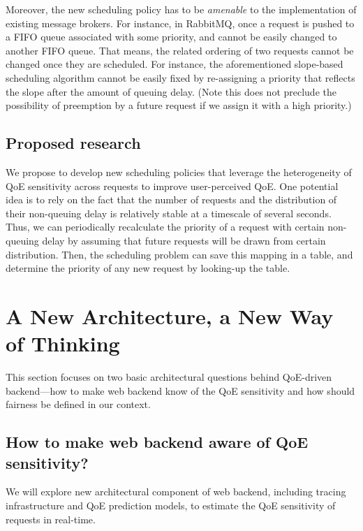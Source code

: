 Moreover, the new scheduling policy has to be {\em amenable} to the implementation of existing message brokers. 
For instance, in RabbitMQ, once a request is pushed to a FIFO queue associated with some priority, and cannot be easily changed to another FIFO queue. 
That means, the related ordering of two requests cannot be changed once they are scheduled.
For instance, the aforementioned slope-based scheduling algorithm cannot be easily fixed by re-assigning a priority that reflects the slope after the amount of queuing delay.
(Note this does not preclude the possibility of preemption by a future request if we assign it with a high priority.)

\subsection{Proposed research}
We propose to develop new scheduling policies that leverage the heterogeneity of QoE sensitivity across requests to improve user-perceived QoE. 
One potential idea is to rely on the fact that the number of requests and the distribution of their non-queuing delay is relatively stable at a timescale of several seconds. 
Thus, we can periodically recalculate the priority of a request with certain non-queuing delay by assuming that future requests will be drawn from certain distribution.
Then, the scheduling problem can save this mapping in a table, and determine the priority of any new request by looking-up the table. 




\section{A New Architecture, a New Way of Thinking}
\label{sec:arch}

This section focuses on two basic architectural questions behind QoE-driven backend---how to make web backend know of the QoE sensitivity and how should fairness be defined in our context.

\subsection{How to make web backend aware of QoE sensitivity?}
\begin{task}
We will explore new architectural component of web backend, including tracing infrastructure and QoE prediction models, to estimate the QoE sensitivity of requests in real-time.
\end{task}

